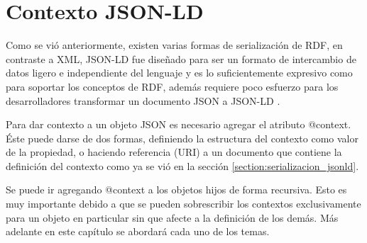 \section{Contexto JSON-LD}

Como se vió anteriormente, existen varias formas de serialización de RDF, en contraste a XML, JSON-LD fue diseñado para ser un formato de intercambio de datos ligero e independiente del lenguaje y es lo suficientemente expresivo como para soportar los conceptos de RDF, además requiere poco esfuerzo para los desarrolladores transformar un documento JSON a JSON-LD \cite{JSONLDJS41:online}. 

Para dar contexto a un objeto JSON es necesario agregar el atributo @context. Éste puede darse de dos formas, definiendo la estructura del contexto como valor de la propiedad, o haciendo referencia (URI) a un documento que contiene la definición del contexto como ya se vió en la sección \ref{section:serializacion_jsonld}.

Se puede ir agregando @context a los objetos hijos de forma recursiva. Esto es muy importante debido a que se pueden sobrescribir los contextos exclusivamente para un objeto en particular sin que afecte a la definición de los demás. Más adelante en este capítulo se abordará cada uno de los temas.



 